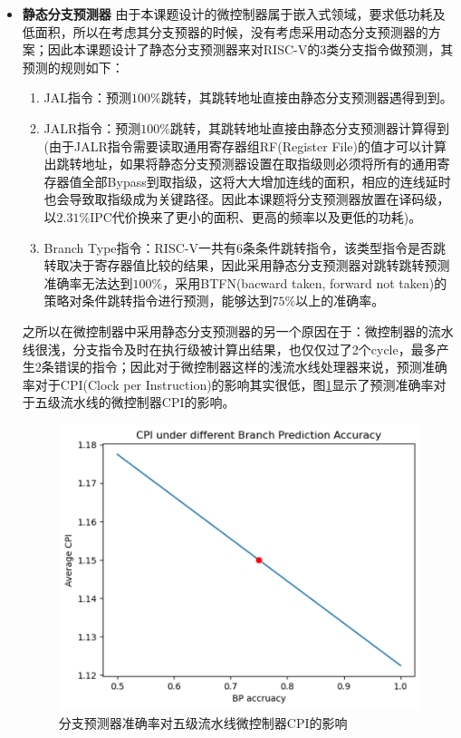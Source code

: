\documentclass[a4paper, 12pt]{article}
\begin{document}
  \begin{itemize}
    \item \textbf{静态分支预测器}
      由于本课题设计的微控制器属于嵌入式领域，要求低功耗及低面积，所以在考虑其分支预器的时候，没有考虑采用动态分支预测器的方案；因此本课题设计了静态分支预测器来对RISC-V的3类分支指令做预测，其预测的规则如下：
      \begin{enumerate}
        \item JAL指令：预测$100\%$跳转，其跳转地址直接由静态分支预测器遇得到到。
        \item JALR指令：预测$100\%$跳转，其跳转地址直接由静态分支预测器计算得到(由于JALR指令需要读取通用寄存器组RF(Register File)的值才可以计算出跳转地址，如果将静态分支预测器设置在取指级则必须将所有的通用寄存器值全部Bypass到取指级，这将大大增加连线的面积，相应的连线延时也会导致取指级成为关键路径。因此本课题将分支预测器放置在译码级，以$2.31\%$IPC代价换来了更小的面积、更高的频率以及更低的功耗)。
        \item Branch Type指令：RISC-V一共有6条条件跳转指令，该类型指令是否跳转取决于寄存器值比较的结果，因此采用静态分支预测器对跳转跳转预测准确率无法达到$100\%$，采用BTFN(bacward taken, forward not taken)的策略对条件跳转指令进行预测，能够达到$75\%$以上的准确率。
      \end{enumerate}
      之所以在微控制器中采用静态分支预测器的另一个原因在于：微控制器的流水线很浅，分支指令及时在执行级被计算出结果，也仅仅过了2个cycle，最多产生2条错误的指令；因此对于微控制器这样的浅流水线处理器来说，预测准确率对于CPI(Clock per Instruction)的影响其实很低，图\ref{fig:sbp_cpi}显示了预测准确率对于五级流水线的微控制器CPI的影响。
    \begin{figure}[htbp]
      \centering
      \includegraphics[width=0.7\linewidth]{./images/sbp_cpi.png}
      \caption{分支预测器准确率对五级流水线微控制器CPI的影响}
      \label{fig:sbp_cpi}
    \end{figure}


\end{itemize}
\end{document}
